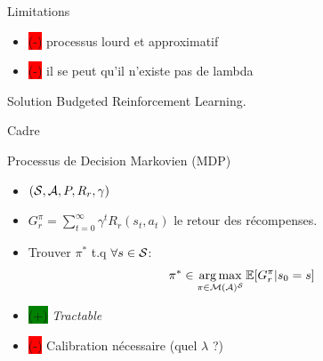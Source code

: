 \documentclass[french,handout]{beamer}
\newcommand{\cplus}{\colorbox{green}{(+)} }
\newcommand{\cmoins}{\colorbox{red}{(-)} }
\begin{document}
    \begin{frame}
        \begin{alertblock}{Limitations}
            \begin{itemize}
                \item \cmoins processus lourd et approximatif %
                \item \cmoins il se peut qu'il n'existe pas de lambda
            \end{itemize}
        \end{alertblock}
        \begin{exampleblock}{Solution}
            Budgeted Reinforcement Learning.
        \end{exampleblock}
    \end{frame}


    \begin{frame}{Cadre}
        \begin{block}{Processus de Decision Markovien (MDP)}
            \begin{itemize}
                \pause\item $(\mathcal{S}, \mathcal{A}, P, R_r, \gamma)$
                \pause\item $G_r^\pi = \sum_{t=0}^\infty \gamma^t R_r(s_t, a_t)$ le retour des récompenses.
                \pause\item Trouver $\pi^*$ t.q $\forall s\in\mathcal{S}$:
                \begin{equation}
                    \label{eq:mdp}
                    \begin{array}{lcr}
                        \displaystyle \pi^* \in \operatorname*{arg\,max}_{\pi\in\mathcal{M}(\mathcal{A})^{\mathcal{S}}} \operatorname*{\mathbb{E}}[G_r^\pi | s_0=s]
                    \end{array}
                \end{equation}

            \end{itemize}
        \end{block}


        \begin{block}{}
            \begin{itemize}
                \item \cplus \textit{Tractable}
                \item \cmoins Calibration nécessaire (quel $\lambda$ ?)
            \end{itemize}
        \end{block}

    \end{frame}
\end{document}
